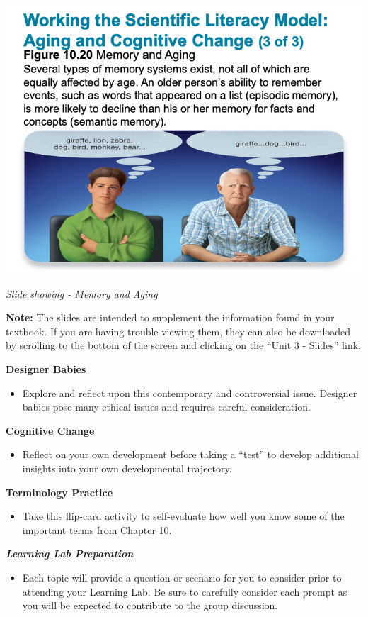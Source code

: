 \documentclass[
]{book}
\providecommand{\tightlist}{%
  \setlength{\itemsep}{0pt}\setlength{\parskip}{0pt}}
\begin{document}
\begin{reflect}
\includegraphics{assets/unit_3/slide_63.png}

\emph{Slide showing - Memory and Aging}

\textbf{Note:} The slides are intended to supplement the information found in your textbook. If you are having trouble viewing them, they can also be downloaded by scrolling to the bottom of the screen and clicking on the ``Unit 3 - Slides'' link.

\textbf{Designer Babies}

\begin{itemize}
\tightlist
\item
  Explore and reflect upon this contemporary and controversial issue. Designer babies pose many ethical issues and requires careful consideration.
\end{itemize}

\textbf{Cognitive Change}

\begin{itemize}
\tightlist
\item
  Reflect on your own development before taking a ``test'' to develop additional insights into your own developmental trajectory.
\end{itemize}

\textbf{Terminology Practice}

\begin{itemize}
\tightlist
\item
  Take this flip-card activity to self-evaluate how well you know some of the important terms from Chapter 10.
\end{itemize}

\textbf{\emph{Learning Lab Preparation}}

\begin{itemize}
\tightlist
\item
  Each topic will provide a question or scenario for you to consider prior to attending your Learning Lab. Be sure to carefully consider each prompt as you will be expected to contribute to the group discussion.
\end{itemize}
\end{reflect}
\end{document}

